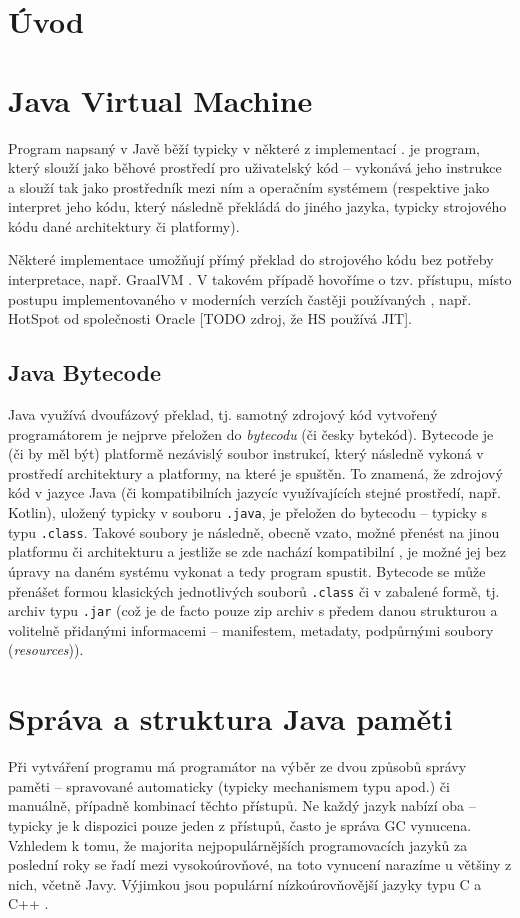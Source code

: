 \chapter{Úvod}


\chapter{Java Virtual Machine}
Program napsaný v Javě běží typicky v některé z implementací .  je program, který slouží jako běhové prostředí pro uživatelský kód -- vykonává jeho instrukce a slouží tak jako prostředník mezi ním a operačním systémem (respektive jako interpret jeho kódu, který následně překládá do jiného jazyka, typicky strojového kódu dané architektury či platformy).

Některé implementace  umožňují přímý překlad do strojového kódu bez potřeby interpretace, např. GraalVM \cite{graalvm}. V takovém případě hovoříme o tzv.  přístupu, místo  postupu implementovaného v moderních verzích častěji používaných , např. HotSpot od společnosti Oracle [TODO zdroj, že HS používá JIT].

\section{Java Bytecode}
Java využívá dvoufázový překlad, tj. samotný zdrojový kód vytvořený programátorem je nejprve přeložen do \textit{bytecodu} (či česky bytekód). Bytecode je (či by měl být) platformě nezávislý soubor instrukcí, který následně  vykoná v prostředí architektury a platformy, na které je spuštěn. To znamená, že zdrojový kód v jazyce Java (či kompatibilních jazycíc využívajících stejné prostředí, např. Kotlin), uložený typicky v souboru \texttt{.java}, je přeložen do bytecodu -- typicky s typu \texttt{.class}. Takové soubory je následně, obecně vzato, možné přenést na jinou platformu či architekturu a jestliže se zde nachází kompatibilní , je možné jej bez úpravy na daném systému vykonat a tedy program spustit. Bytecode se může přenášet formou klasických jednotlivých souborů \texttt{.class} či v zabalené formě, tj. archiv typu \texttt{.jar} (což je de facto pouze zip archiv s předem danou strukturou a volitelně přidanými informacemi -- manifestem, metadaty, podpůrnými soubory (\textit{resources})).

\chapter{Správa a struktura Java paměti}
Při vytváření programu má programátor na výběr ze dvou způsobů správy paměti -- spravované automaticky (typicky mechanismem typu  apod.) či manuálně, případně kombinací těchto přístupů. Ne každý jazyk nabízí oba -- typicky je k dispozici pouze jeden z přístupů, často je správa GC vynucena. Vzhledem k tomu, že majorita nejpopulárnějších programovacích jazyků za poslední roky se řadí mezi vysokoúrovňové, na toto vynucení  narazíme u většiny z nich, včetně Javy. Výjimkou jsou populární nízkoúrovňovější jazyky typu C a C++ \cite{stackoverflowinsights}\cite{tiobeindex}.


